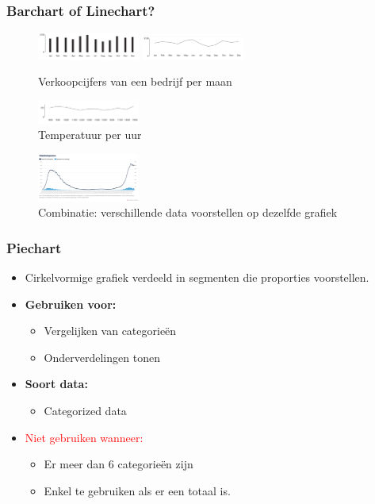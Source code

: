 \documentclass{article}
\newcommand{\bold}[1]{\textbf{#1}}
\begin{document}
\subsubsection{Barchart of Linechart?}

\begin{figure}[H]
    \centering
    \includegraphics[width=0.3\textwidth]{dv-bar-or-line1.png}
    \includegraphics[width=0.3\textwidth]{dv-bar-or-line1-2.png}
    \caption{Verkoopcijfers van een bedrijf per maan}
\end{figure}

\begin{figure}[H]
    \centering
    \includegraphics[width=0.3\textwidth]{dv-bar-or-line2.png}
    \caption{Temperatuur per uur}
\end{figure}
\begin{figure}[H]
    \centering
    \includegraphics[width=0.3\textwidth]{dv-bar-or-line3.png}
    \caption{Combinatie: verschillende data voorstellen op dezelfde grafiek}
\end{figure}

\subsubsection{Piechart}

\begin{itemize}
    \item Cirkelvormige grafiek verdeeld in segmenten die proporties voorstellen.
    \item \bold{Gebruiken voor:}
    \begin{itemize}
        \item Vergelijken van categorieën
        \item Onderverdelingen tonen
    \end{itemize}
    \item \bold{Soort data:}
    \begin{itemize}
        \item Categorized data
    \end{itemize}
    \item \textcolor{red}{Niet gebruiken wanneer:}
    \begin{itemize}
        \item Er meer dan 6 categorieën zijn
        \item Enkel te gebruiken als er een totaal is.
    \end{itemize}
\end{itemize}
\end{document}
